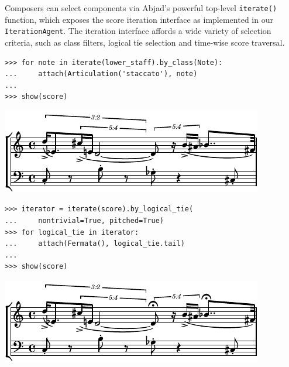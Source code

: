 \documentclass{article}
\begin{document}
Composers can select components via Abjad's powerful top-level
\texttt{iterate()} function, which exposes the score iteration interface as
implemented in our \texttt{IterationAgent}. The iteration interface affords a
wide variety of selection criteria, such as class filters, logical tie
selection and time-wise score traversal.

\begin{lstlisting}
>>> for note in iterate(lower_staff).by_class(Note):
...     attach(Articulation('staccato'), note)
...
>>> show(score)
\end{lstlisting}
\includegraphics{assets/lilypond-85c47ec39685eb2a539925a3599691c2.pdf}

\begin{lstlisting}
>>> iterator = iterate(score).by_logical_tie(
...     nontrivial=True, pitched=True)
>>> for logical_tie in iterator:
...     attach(Fermata(), logical_tie.tail)
...
>>> show(score)
\end{lstlisting}
\includegraphics{assets/lilypond-1981e2f1300698407cb416bc14b38c23.pdf}
\end{document}
